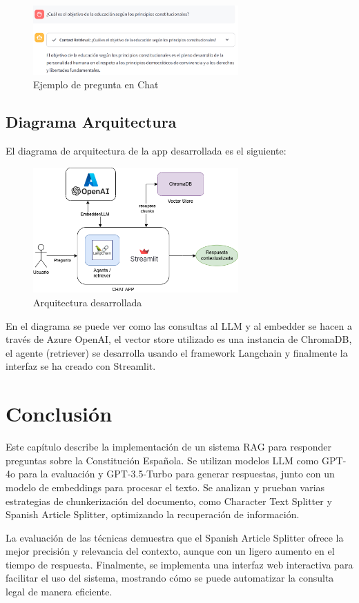 \newpage

\begin{figure}[h]
\centering
\includegraphics[width=0.7\textwidth]{figuras/capitulo6/chat1.png}
\caption{Ejemplo de pregunta en Chat}\label{fig:chat1}
\end{figure}

\subsection{Diagrama Arquitectura}

El diagrama de arquitectura de la app desarrollada es el siguiente:

\begin{figure}[h]
\centering
\includegraphics[width=0.7\textwidth]{figuras/capitulo6/arquitectura.png}
\caption{Arquitectura desarrollada}\label{fig:arquitectura}
\end{figure}

En el diagrama se puede ver como las consultas al LLM y al embedder se hacen a través de Azure OpenAI, el vector store utilizado es una instancia de ChromaDB, el agente (retriever) se desarrolla usando el framework Langchain y finalmente la interfaz se ha creado con Streamlit.

\section{Conclusión}

Este capítulo describe la implementación de un sistema RAG para responder preguntas sobre la Constitución Española. Se utilizan modelos LLM como GPT-4o para la evaluación y GPT-3.5-Turbo para generar respuestas, junto con un modelo de embeddings para procesar el texto. Se analizan y prueban varias estrategias de chunkerización del documento, como Character Text Splitter y Spanish Article Splitter, optimizando la recuperación de información.

La evaluación de las técnicas demuestra que el Spanish Article Splitter ofrece la mejor precisión y relevancia del contexto, aunque con un ligero aumento en el tiempo de respuesta. Finalmente, se implementa una interfaz web interactiva para facilitar el uso del sistema, mostrando cómo se puede automatizar la consulta legal de manera eficiente.


